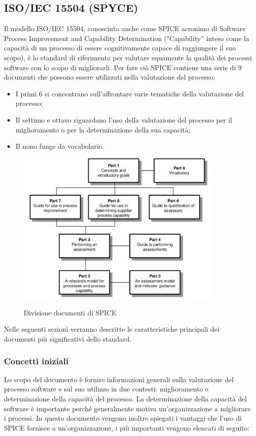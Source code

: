 \documentclass[../piano-di-qualifica.tex]{subfiles}
\begin{document}
\subsection{ISO/IEC 15504 (SPYCE)}%
\label{sec:iso/iec_15504_spyce}
Il modello ISO/IEC 15504, conosciuto anche come SPICE acronimo di Software Process Improvement and Capability Determination ("Capability” inteso come la capacità di un processo di essere cognitivamente capace di raggiungere il suo scopo), è lo standard di riferimento per valutare equamente la qualità dei processi software con lo scopo di migliorarli.
Per fare ciò SPICE contiene una serie di 9 documenti che possono essere utilizzati nella valutazione del processo:
\begin{itemize}
    \item I primi 6 si concentrano sull'affrontare varie tematiche della valutazione del processo;
    \item Il settimo e ottavo riguardano l'uso della valutazione del processo per il miglioramento o per la determinazione della sua capacità;
    \item Il nono funge da vocabolario.
\end{itemize}

\begin{figure}[H]
    \centering
    \includegraphics[width=10cm]{img/spice_doc.png}
    \label{fig:scice_documenti}
    \caption{Divisione documenti di SPICE}
\end{figure}


Nelle seguenti sezioni verranno descritte le caratteristiche principali dei documenti più significativi dello standard.

\subsubsection{Concetti iniziali}
\label{sub:concetti_iniziali}
Lo scopo del documento è fornire informazioni generali sulla valutazione del processo software e sul suo utilizzo in due contesti: miglioramento e determinazione della capacità del processo.
La determinazione della capacità del software è importante perché generalmente motiva un'organizzazione a migliorare i processi.
In questo documento vengono inoltre spiegati i vantaggi che l'uso di SPICE fornisce a un'organizzazione, i più importanti vengono elencati di seguito:
\end{document}

